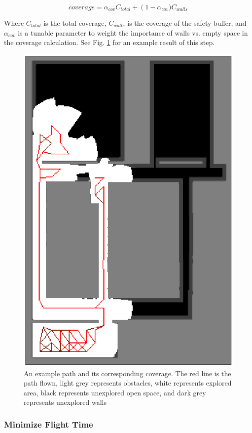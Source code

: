 \documentclass[letterpaper, 10 pt, conference]{ieeeconf}  %
\begin{document}
\begin{equation}%
    coverage = \alpha_{cov} C_{total} + \left(1-\alpha_{cov})\right. C_{walls}
\end{equation}

Where $C_{total}$ is the total coverage, $C_{walls}$ is the coverage of the safety buffer, and $\alpha_{cov}$ is a tunable parameter to weight the importance of walls vs. empty space in the coverage calculation. See Fig. \ref{fig:coverage} for an example result of this step.

\begin{figure}
\centering
\includegraphics[width=0.8\linewidth]{figures/coverage_map3.png}
\caption{An example path and its corresponding coverage. The red line is the path flown, light grey represents obstacles, white represents explored area, black represents unexplored open space, and dark grey represents unexplored walls}
\label{fig:coverage}
\end{figure}

\subsubsection{Minimize Flight Time}
\end{document}
